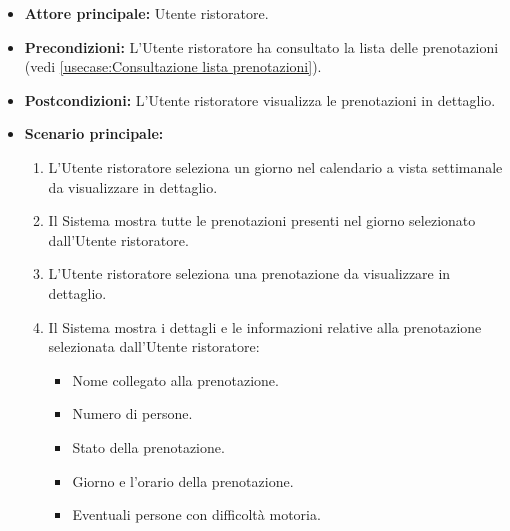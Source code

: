 \label{usecase:Dettaglio lista prenotazioni}
\begin{itemize}
	\item \textbf{Attore principale:} Utente ristoratore.

	\item \textbf{Precondizioni:} L'Utente ristoratore ha consultato la lista delle prenotazioni (vedi \autoref{usecase:Consultazione lista prenotazioni}).

	\item \textbf{Postcondizioni:} L'Utente ristoratore visualizza le prenotazioni in dettaglio.


	\item \textbf{Scenario principale:}
	      \begin{enumerate}
		      \item L'Utente ristoratore seleziona un giorno nel calendario a vista settimanale da visualizzare in dettaglio.
		      \item Il Sistema mostra tutte le prenotazioni presenti nel giorno selezionato dall'Utente ristoratore.
		      
		      \item L'Utente ristoratore seleziona una prenotazione da visualizzare in dettaglio.
		      \item Il Sistema mostra i dettagli e le informazioni relative alla prenotazione selezionata dall'Utente ristoratore:
		      \begin{itemize}
				\item Nome collegato alla prenotazione.
				\item Numero di persone.
				\item Stato della prenotazione.
				\item Giorno e l'orario della prenotazione.
				\item Eventuali persone con difficoltà motoria.
			  \end{itemize}

	      \end{enumerate}
\end{itemize}
